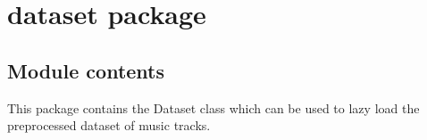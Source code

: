 \documentclass[letterpaper,10pt,english]{sphinxmanual}
\begin{document}
\begin{fulllineitems}
\begin{fulllineitems}
\label{\detokenize{docs/source/config:config.TRAIN_CONFIG.STEPS}}
\end{fulllineitems}


\begin{fulllineitems}
\label{\detokenize{docs/source/config:config.TRAIN_CONFIG.TRAINED_ON}}
\end{fulllineitems}


\end{fulllineitems}



\chapter{dataset package}
\label{\detokenize{docs/source/dataset:dataset-package}}\label{\detokenize{docs/source/dataset::doc}}

\section{Module contents}
\label{\detokenize{docs/source/dataset:module-dataset}}\label{\detokenize{docs/source/dataset:module-contents}}
This package contains the Dataset class which can be used to lazy load the preprocessed dataset of music tracks.
\end{document}
